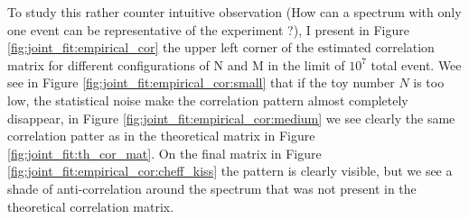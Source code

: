 \documentclass[../main.tex]{subfiles}
\begin{document}
To study this rather counter intuitive observation (How can a spectrum with only one event can be representative of the experiment ?), I present in Figure \ref{fig:joint_fit:empirical_cor} the upper left corner of the estimated correlation matrix for different configurations of N and M in the limit of $10^7$ total event. Wee see in Figure \ref{fig:joint_fit:empirical_cor:small} that if the toy number $N$ is too low, the statistical noise make the correlation pattern almost completely disappear, in Figure \ref{fig:joint_fit:empirical_cor:medium} we see clearly the same correlation patter as in the theoretical matrix in Figure \ref{fig:joint_fit:th_cor_mat}.
On the final matrix in Figure \ref{fig:joint_fit:empirical_cor:cheff_kiss} the pattern is clearly visible, but we see a shade of anti-correlation around the spectrum that was not present in the theoretical correlation matrix.
\end{document}

